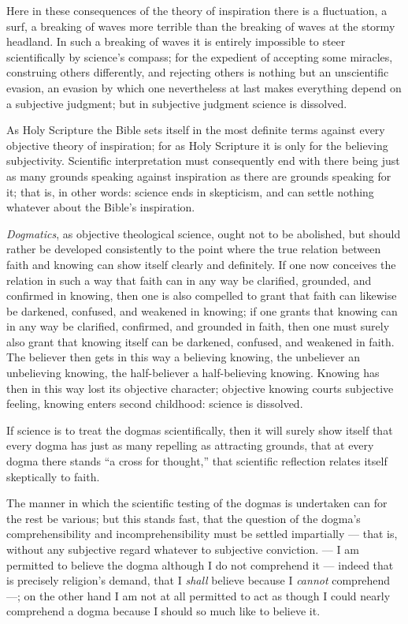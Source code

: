 \documentclass[12pt,a4paper]{book}
\begin{document}
Here in these consequences of the theory of inspiration there is a fluctuation, a surf, a breaking of
waves more terrible than
the breaking of waves at the stormy headland. In such a breaking of waves it is entirely impossible to
steer scientifically by science's compass; for the expedient of accepting some miracles, construing
others differently, and rejecting others is nothing but an unscientific evasion, an evasion by which
one nevertheless at last makes everything depend on a subjective judgment; but in subjective judgment
science is dissolved.

As Holy Scripture the Bible sets itself in the most definite terms against every objective theory of
inspiration; for as Holy Scripture it is only for the believing subjectivity. Scientific
interpretation must consequently end with there being just as many grounds speaking against
inspiration as there are grounds speaking for it; that is, in other words: science ends in
skepticism, and can settle nothing whatever about the Bible's inspiration.

\emph{Dogmatics}, as objective theological science, ought not to be abolished, but should rather be
developed consistently to the point where the true relation between faith and knowing can show itself
clearly and definitely. If one now conceives the relation in such a way that faith can in any way be
clarified, grounded, and confirmed in knowing, then one is also compelled to grant that faith can
likewise be darkened, confused, and weakened in knowing; if one grants that knowing can in any way be
clarified, confirmed, and grounded in faith, then one must surely also grant that knowing itself can
be darkened, confused, and weakened in faith. The believer then gets in this way a believing knowing,
the unbeliever an unbelieving knowing, the half-believer a half-believing knowing. Knowing has then in
this way lost its objective character; objective knowing courts subjective feeling, knowing enters
second childhood: science is dissolved.

If science is to treat the dogmas scientifically, then it will surely show itself that every dogma has
just as many repelling as attracting grounds, that at every dogma there stands
``a cross for thought,'' that scientific reflection relates itself skeptically to faith.

The manner in which the scientific testing of the dogmas is undertaken can for the rest be various;
but this stands fast, that the question of the dogma's comprehensibility and incomprehensibility must
be settled impartially --- that is, without any subjective regard whatever to subjective conviction.
--- I am permitted to believe the dogma although I do not comprehend it --- indeed that is precisely
religion's demand, that I \emph{shall} believe because I \emph{cannot} comprehend ---; on the other
hand I am not at all permitted to act as though I could nearly comprehend a dogma because I should so
much like to believe it.
\end{document}
